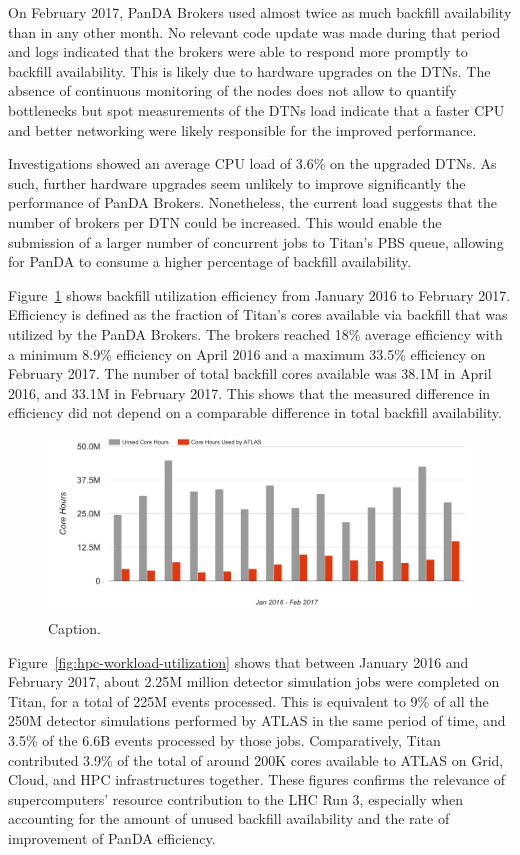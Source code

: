 On February 2017, PanDA Brokers used almost twice as much backfill availability
than in any other month. No relevant code update was made during that period and
logs indicated that the brokers were able to respond more promptly to backfill
availability. This is likely due to hardware upgrades on the DTNs. The absence
of continuous monitoring of the nodes does not allow to quantify bottlenecks but
spot measurements of the DTNs load indicate that a faster CPU and better
networking were likely responsible for the improved performance.

Investigations showed an average CPU load of 3.6\% on the upgraded DTNs. As
such, further hardware upgrades seem unlikely to improve significantly the
performance of PanDA Brokers. Nonetheless, the current load suggests that the
number of brokers per DTN could be increased. This would enable the submission
of a larger number of concurrent jobs to Titan's PBS queue, allowing for PanDA
to consume a higher percentage of backfill availability.

Figure~\ref{fig:backfill-utilization} shows backfill utilization efficiency from
January 2016 to February 2017. Efficiency is defined as the fraction of Titan’s
cores available via backfill that was utilized by the PanDA Brokers. The brokers
reached 18\% average efficiency with a minimum 8.9\% efficiency on April 2016
and a maximum 33.5\% efficiency on February 2017. The number of total backfill
cores available was 38.1M in April 2016, and 33.1M in February 2017. This shows
that the measured difference in efficiency did not depend on a comparable
difference in total backfill availability.

\begin{figure}[htp]
\includegraphics[clip,width=\columnwidth]{figures/backfill_consumption.png}
\caption{Caption.}
\label{fig:backfill-utilization}
\end{figure}

Figure~\ref{fig:hpc-workload-utilization} shows that between January 2016 and
February 2017, about 2.25M million detector simulation jobs were completed on
Titan, for a total of 225M events processed. This is equivalent to 9\% of all
the 250M detector simulations performed by ATLAS in the same period of time, and
3.5\% of the 6.6B events processed by those jobs. Comparatively, Titan
contributed 3.9\% of the total of around 200K cores available to ATLAS on Grid,
Cloud, and HPC infrastructures together. These figures confirms the relevance of
supercomputers' resource contribution to the LHC Run 3, especially when
accounting for the amount of unused backfill availability and the rate of
improvement of PanDA efficiency.

